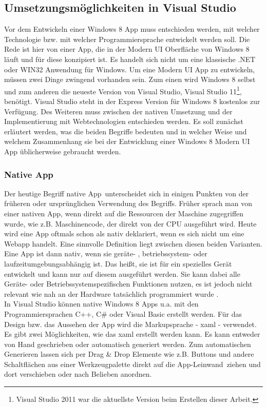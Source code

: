 \documentclass[12pt,a4paper,bibtotoc,abstracton]{scrartcl}
\begin{document}
\subsection{Umsetzungsmöglichkeiten in Visual Studio}
\label{subsec:nativ_vs_web}
Vor dem Entwickeln einer Windows 8 App muss entschieden werden, mit welcher Technologie bzw. mit welcher Programmiersprache entwickelt werden soll. Die Rede ist hier von einer App, die in der Modern UI Oberfläche von Windows 8 läuft und für diese konzipiert ist. Es handelt sich nicht um eine klassische .NET oder WIN32 Anwendung für Windows. Um eine Modern UI App zu entwickeln, müssen zwei Dinge zwingend vorhanden sein. Zum einen wird Windows 8 selbst und zum anderen die neueste Version von Visual Studio, Visual Studio 11\footnote{Visual Studio 2011 war die aktuellste Version beim Erstellen dieser Arbeit.}, benötigt. Visual Studio steht in der Express Version für Windows 8 kostenlos zur Verfügung. Des Weiteren muss zwischen der nativen Umsetzung und der Implementierung mit Webtechnologien entschieden werden. Es soll zunächst erläutert werden, was die beiden Begriffe bedeuten und in welcher Weise und welchem Zusammenhang sie bei der Entwicklung einer Windows 8 Modern UI App üblicherweise gebraucht werden.

\subsubsection{Native App}
\label{subsubsec:nativ}
Der heutige Begriff \glqq native App\grqq\ unterscheidet sich in einigen Punkten von der früheren oder ursprünglichen Verwendung des Begriffs. Früher sprach man von einer nativen App, wenn direkt auf die Ressourcen der  Maschine zugegriffen wurde, wie z.B. Maschinencode, der direkt von der CPU ausgeführt wird. Heute wird eine App oftmals schon als nativ deklariert, wenn es sich nicht um eine Webapp handelt. Eine sinnvolle Definition liegt zwischen diesen beiden Varianten. Eine App ist dann nativ, wenn sie geräte- , betriebssystem- oder laufzeitumgebungsabhängig ist. Das heißt, sie ist für ein spezielles Gerät entwickelt und kann nur auf diesem ausgeführt werden. Sie kann dabei alle Geräte- oder Betriebssystemspezifischen Funktionen nutzen, es ist jedoch nicht relevant wie nah an der Hardware tatsächlich programmiert wurde \citep{OBrian2013}.\\
In Visual Studio können native Windows 8  Apps u.a. mit den Programmiersprachen C++, C\# oder Visual Basic erstellt werden. Für das Design bzw. das Aussehen der App wird die Markupsprache - \ac{xaml} - verwendet. Es gibt zwei Möglichkeiten, wie das \ac{xaml} erstellt werden kann. Es kann entweder von Hand geschrieben oder automatisch generiert werden. Zum automatischen Generieren lassen sich per Drag \& Drop Elemente wie z.B. Buttons und andere Schaltflächen aus einer Werkzeugpalette direkt auf die \glqq App-Leinwand\grqq\ ziehen und dort verschieben oder nach Belieben anordnen.
\end{document}
